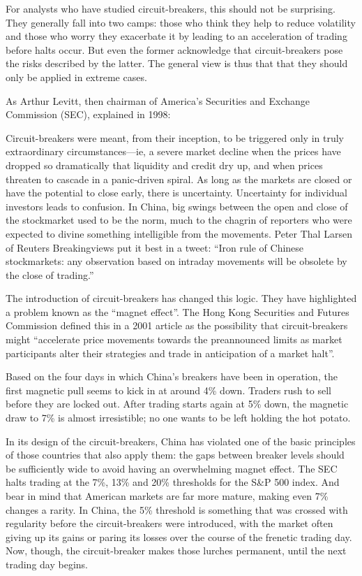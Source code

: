 \documentclass[11pt]{article}
\begin{document}
For analysts who have studied circuit-breakers, this should not be surprising.
They generally fall into two camps: those who think they help to reduce
volatility and those who worry they exacerbate it by leading to an acceleration
of trading before halts occur. But even the former acknowledge that
circuit-breakers pose the risks described by the latter. The general view is
thus that that they should only be applied in extreme cases.

As Arthur Levitt, then chairman of America's Securities and Exchange Commission
(SEC), explained in 1998:

Circuit-breakers were meant, from their inception, to be triggered only in truly
extraordinary circumstances—ie, a severe market decline when the prices have
dropped so dramatically that liquidity and credit dry up, and when prices
threaten to cascade in a panic-driven spiral. As long as the markets are closed
or have the potential to close early, there is uncertainty. Uncertainty for
individual investors leads to confusion. In China, big swings between the open
and close of the stockmarket used to be the norm, much to the chagrin of
reporters who were expected to divine something intelligible from the movements.
Peter Thal Larsen of Reuters Breakingviews put it best in a tweet: “Iron rule of
Chinese stockmarkets: any observation based on intraday movements will be
obsolete by the close of trading.”

The introduction of circuit-breakers has changed this logic. They have
highlighted a problem known as the “magnet effect”. The Hong Kong Securities and
Futures Commission defined this in a 2001 article as the possibility that
circuit-breakers might “accelerate price movements towards the preannounced
limits as market participants alter their strategies and trade in anticipation
of a market halt”.

Based on the four days in which China’s breakers have been in operation, the
first magnetic pull seems to kick in at around 4\% down. Traders rush to sell
before they are locked out. After trading starts again at 5\% down, the magnetic
draw to 7\% is almost irresistible; no one wants to be left holding the hot
potato.

In its design of the circuit-breakers, China has violated one of the basic
principles of those countries that also apply them: the gaps between breaker
levels should be sufficiently wide to avoid having an overwhelming magnet
effect. The SEC halts trading at the 7\%, 13\% and 20\% thresholds for the S\&P 500
index. And bear in mind that American markets are far more mature, making even
7\% changes a rarity. In China, the 5\% threshold is something that was crossed
with regularity before the circuit-breakers were introduced, with the market
often giving up its gains or paring its losses over the course of the frenetic
trading day. Now, though, the circuit-breaker makes those lurches permanent,
until the next trading day begins.
\end{document}
